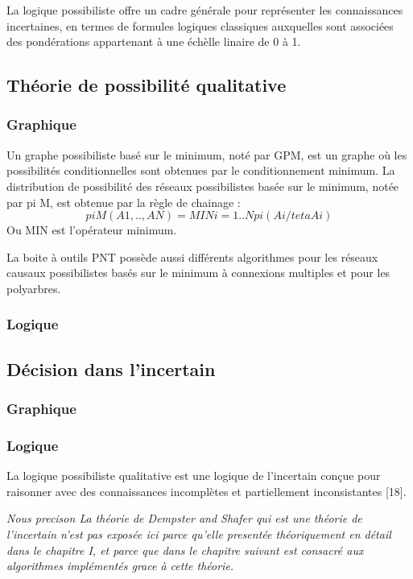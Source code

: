 La logique possibiliste offre un cadre générale pour représenter les connaissances incertaines, en termes de formules logiques classiques auxquelles sont associées des pondérations appartenant à une échèlle linaire de 0 à 1.
\subsection{Théorie de possibilité qualitative}
\subsubsection{Graphique}

Un graphe possibiliste basé sur le minimum, noté par GPM, est un graphe où les possibilités conditionnelles sont obtenues par le conditionnement minimum. La distribution de possibilité des réseaux possibilistes basée sur le minimum, notée par pi M, est obtenue par la règle de chainage :
\begin{equation}
 pi M (A1, .., AN) = MINi=1..N pi (Ai/teta Ai) 
\end{equation}
Ou MIN est  l’opérateur minimum.

La boite à outils PNT possède aussi différents algorithmes pour les réseaux causaux possibilistes basés sur le minimum à connexions multiples et pour les polyarbres. 
\subsubsection{Logique}



\subsection{Décision dans l’incertain}
\subsubsection{Graphique}

\subsubsection{Logique}
La logique possibiliste qualitative est une logique de l'incertain conçue pour raisonner avec des connaissances incomplètes et partiellement inconsistantes [18].

\emph{ Nous precison La théorie de Dempster and Shafer qui est une théorie de l’incertain n'est pas exposée ici parce qu’elle presentée théoriquement en détail dans le chapitre I, et parce que dans le chapitre suivant est consacré aux algorithmes implémentés grace à cette théorie.}
